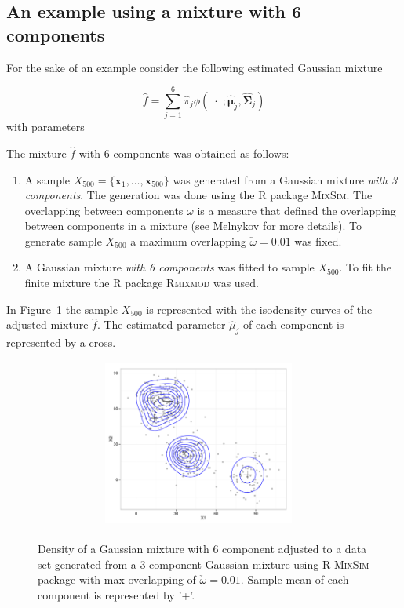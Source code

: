 \documentclass[10pt, a4paper]{article}
\newcommand{\m}[1]{\boldsymbol{#1}}
\begin{document}
\subsection*{An example using a mixture with 6 components}

For the sake of an example consider the following estimated Gaussian mixture

\[
\hat{f} = \sum_{j=1}^6 \hat{\pi}_j \phi(\;\cdot\; ; \hat{\m\mu}_j, \hat{\m\Sigma}_j)
\]
with parameters
{\small

}

The mixture $\hat{f}$ with $6$ components was obtained as follows:
\begin{enumerate}
\item A sample  $X_{500}=\{\m x_1, \dots, \m x_{500}\}$ was generated from a Gaussian mixture \emph{with 3 components}. The generation was done using the R package \textsc{MixSim}. The overlapping between components $\omega$ is a measure that defined the overlapping between components in a mixture (see Melnykov for more details). To generate sample $X_{500}$ a maximum overlapping $\check{\omega} = 0.01$ was fixed.
\item A Gaussian mixture \emph{with 6 components} was fitted to sample $X_{500}$. To fit the finite mixture the R package \textsc{Rmixmod} was used.
\end{enumerate}
In Figure~\ref{ex_mixture} the sample $X_{500}$ is represented with the isodensity curves of the adjusted mixture $\hat{f}$. The estimated parameter $\hat{\mu}_j$ of each component is represented by a cross.

\begin{figure}[thbp]
\begin{center}
\begin{tabular}{cc}
  \includegraphics[trim=0cm 0cm 0cm 0cm,width=0.6\textwidth]{partition-example-mixture.pdf} \\
 \end{tabular}
 \caption{Density of a Gaussian mixture with 6 component adjusted to a data set generated from a 3 component Gaussian mixture using R \textsc{MixSim} package with max overlapping of $\check{\omega} = 0.01$. Sample mean of each component is represented by '+'.}\label{ex_mixture}
\end{center}
\end{figure}
\end{document}
